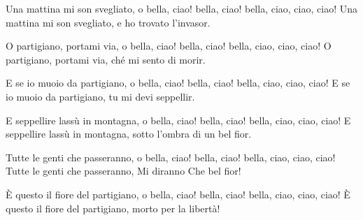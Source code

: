 
\beginverse
Una mattina mi son svegliato,
o bella, ciao! bella, ciao! bella, ciao, ciao, ciao!
Una mattina mi son svegliato,
e ho trovato l'invasor.
\endverse

\beginverse
O partigiano, portami via,
o bella, ciao! bella, ciao! bella, ciao, ciao, ciao!
O partigiano, portami via,
ch\'e mi sento di morir.
\endverse

\beginverse
E se io muoio da partigiano,
o bella, ciao! bella, ciao! bella, ciao, ciao, ciao!
E se io muoio da partigiano,
tu mi devi seppellir.
\endverse

\beginverse
E seppellire lass\`u in montagna,
o bella, ciao! bella, ciao! bella, ciao, ciao, ciao!
E seppellire lass\`u in montagna,
sotto l'ombra di un bel fior.
\endverse

\beginverse
Tutte le genti che passeranno,
o bella, ciao! bella, ciao! bella, ciao, ciao, ciao!
Tutte le genti che passeranno,
Mi diranno Che bel fior!
\endverse

\beginverse
\`E questo il fiore del partigiano,
o bella, ciao! bella, ciao! bella, ciao, ciao, ciao!
\`E questo il fiore del partigiano,
morto per la libert\`a!
\endverse
\endsong